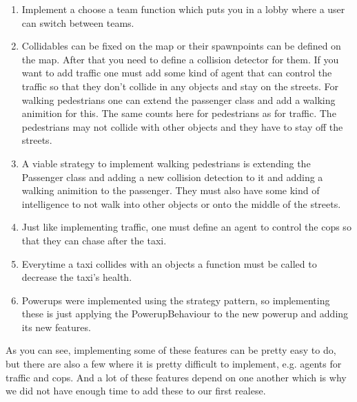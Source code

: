 \begin{enumerate}	
\item Implement a choose a team function which puts you in a lobby where a user can switch between teams.
\item Collidables can be fixed on the map or their spawnpoints can be defined on the map. After that you need to define a collision detector for them. If you want to add traffic one must add some kind of agent that can control the traffic so that they don't collide in any objects and stay on the streets. For walking pedestrians one can extend the passenger class and add a walking animition for this. The same counts here for pedestrians as for traffic. The pedestrians may not collide with other objects and they have to stay off the streets.
\item A viable strategy to implement walking pedestrians is extending the Passenger class and adding a new collision detection to it and adding a walking animition to the passenger. They must also have some kind of intelligence to not walk into other objects or onto the middle of the streets.
\item Just like implementing traffic, one must define an agent to control the cops so that they can chase after the taxi.
\item Everytime a taxi collides with an objects a function must be called to decrease the taxi's health.
\item Powerups were implemented using the strategy pattern, so implementing these is just applying the PowerupBehaviour to the new powerup and adding its new features.
\end{enumerate}
As you can see, implementing some of these features can be pretty easy to do, but there are also a few where it is pretty difficult to implement, e.g. agents for traffic and cops. And a lot of these features depend on one another which is why we did not have enough time to add these to our first realese.



